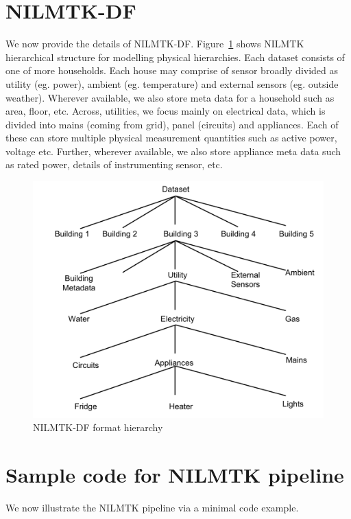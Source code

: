 \documentclass{sig-alternate}
\newcommand{\figref}[1]{Figure~\ref{#1}}
\begin{document}
\section{NILMTK-DF}
\label{app:appendix_data_format}
\noindent We now provide the details of NILMTK-DF. \figref{fig:nilmtk-format} shows NILMTK hierarchical structure for modelling physical hierarchies. Each dataset consists of one of more households. Each house may comprise of sensor broadly divided as utility (eg. power), ambient (eg. temperature) and external sensors (eg. outside weather). Wherever available, we also store meta data for a household such as area, floor, etc.
Across, utilities, we focus mainly on electrical data, which is divided into mains (coming from grid), panel (circuits) and appliances. Each of these can store multiple physical measurement quantities such as 
active power, voltage etc. Further, wherever available, we also store appliance meta data such as rated power, details of instrumenting sensor, etc.
\begin{figure}
\centering 
\includegraphics[scale=0.5]{figures/data_format.pdf}
\caption{NILMTK-DF format hierarchy}
\label{fig:nilmtk-format}
\end{figure}

\section{Sample code for NILMTK pipeline}
\label{app:appendix_pipeline}
\noindent We now illustrate the NILMTK pipeline via a minimal code example.
\end{document}
